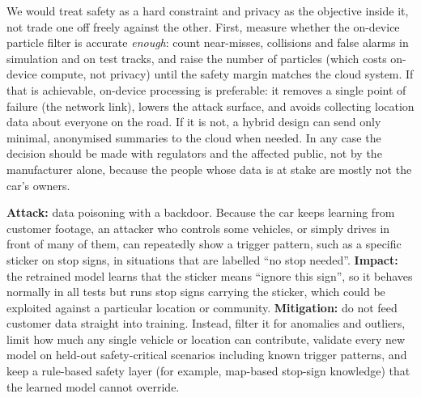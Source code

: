 \begin{solution}
We would treat safety as a hard constraint and privacy as the objective inside it, not trade one off freely against
the other. First, measure whether the on-device particle filter is accurate \emph{enough}: count near-misses, collisions
and false alarms in simulation and on test tracks, and raise the number of particles (which costs on-device compute,
not privacy) until the safety margin matches the cloud system. If that is achievable, on-device processing is
preferable: it removes a single point of failure (the network link), lowers the attack surface, and avoids collecting
location data about everyone on the road. If it is not, a hybrid design can send only minimal, anonymised summaries to the
cloud when needed. In any case the decision should be made with regulators and the affected public, not by the
manufacturer alone, because the people whose data is at stake are mostly not the car's owners.
\end{solution}

\begin{solution}
\textbf{Attack:} data poisoning with a backdoor. Because the car keeps learning from customer footage, an attacker who
controls some vehicles, or simply drives in front of many of them, can repeatedly show a trigger pattern, such as a
specific sticker on stop signs, in situations that are labelled ``no stop needed''. \textbf{Impact:} the retrained
model learns that the sticker means ``ignore this sign'', so it behaves normally in all tests but runs stop signs
carrying the sticker, which could be exploited against a particular location or community. \textbf{Mitigation:} do
not feed customer data straight into training. Instead, filter it for anomalies and outliers, limit how much any
single vehicle or location can contribute, validate every new model on held-out safety-critical scenarios including
known trigger patterns, and keep a rule-based safety layer (for example, map-based stop-sign knowledge) that the
learned model cannot override.
\end{solution}
